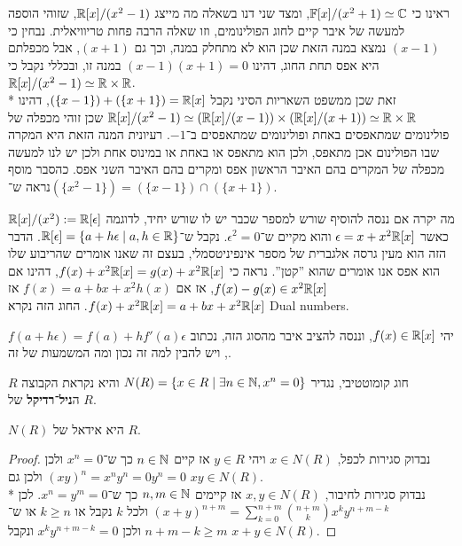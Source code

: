 \begin{example}
	ראינו כי $\mathbb{F}[x] / (x^2 + 1) \simeq \mathbb{C}$, ומצד שני דנו בשאלה מה מייצג $\mathbb{R}[x] / (x^2 - 1)$, שזוהי הוספה למעשה של איבר קיים לחוג הפולינומים, וזו שאלה הרבה פחות טריוויאלית.
	נבחין כי $(x - 1)$ נמצא במנה הזאת שכן הוא לא מתחלק במנה, וכך גם $(x + 1)$, אבל מכפלתם היא אפס תחת החוג, דהינו $(x - 1)(x + 1) = 0$ במנה זו, ובכללי נקבל כי $\mathbb{R}[x] / (x^2 - 1) \simeq \mathbb{R} \times \mathbb{R}$. \\*
	זאת שכן ממשפט השאריות הסיני נקבל $(\{x - 1\}) + (\{x + 1\}) = \mathbb{R}[x]$,
	דהינו $\mathbb{R}[x] / (x^2 - 1) \simeq (\mathbb{R}[x]/(x - 1)) \times (\mathbb{R}[x]/(x + 1)) \simeq \mathbb{R} \times \mathbb{R}$ שכן זוהי מכפלה של פולינומים שמתאפסים באחת ופולינומים שמתאפסים ב־$-1$.
	רעיונית המנה הזאת היא המקרה שבו הפולינום אכן מתאפס, ולכן הוא מתאפס או באחת או במינוס אחת ולכן יש לנו למעשה מכפלה של המקרים בהם האיבר הראשון אפס ומקרים בהם האיבר השני אפס.
	כהסבר מוסף נראה ש־$(\{x^2 - 1\}) = (\{x - 1\}) \cap (\{x + 1\})$.
\end{example}
מה יקרה אם ננסה להוסיף שורש למספר שכבר יש לו שורש יחיד, לדוגמה $\mathbb{R}[x] / (x^2) := \mathbb{R}[\epsilon]$ כאשר $\epsilon = x + x^2 \mathbb{R}[x]$ והוא מקיים ש־$\epsilon^2 = 0$.
נקבל ש־$\mathbb{R}[\epsilon] = \{ a + h\epsilon \mid a, h \in \mathbb{R} \}$. הדבר הזה הוא מעין גרסה אלגברית של מספר אינפיניטסמלי, בעצם זה שאנו אומרים שהריבוע שלו הוא אפס אנו אומרים שהוא ''קטן''.
נראה כי $f(x) + x^2 \mathbb{R}[x] = g(x) + x^2 \mathbb{R}[x]$, דהינו אם $f(x) - g(x) \in x^2 \mathbb{R}[x]$, אז אם $f(x) = a + bx + x^2 h(x)$ אז $f(x) + x^2 \mathbb{R}[x] = a + bx + x^2 \mathbb{R}[x]$.
החוג הזה נקרא Dual numbers.
\begin{exercise}
	יהי $f(x) \in \mathbb{R}[x]$, וננסה להציב איבר מהסוג הזה, נכתוב $f(a + h\epsilon) = f(a) + h f'(a) \epsilon$, ויש להבין למה זה נכון ומה המשמעות של זה.
\end{exercise}
\begin{definition}
	$R$ חוג קומוטטיבי, נגדיר $N(R) = \{ x \in R \mid \exists n \in \mathbb{N}, x^n = 0 \}$ והיא נקראת הקבוצה ה\textbf{ניל־רדיקל} של $R$.
\end{definition}
\begin{proposition}
	$N(R)$ היא אידאל של $R$.
\end{proposition}
\begin{proof}
	נבדוק סגירות לכפל, $x \in N(R)$ ויהי $y \in R$ אז קיים $n \in \mathbb{N}$ כך ש־$x^n = 0$ ולכן ${(xy)}^n = x^n y^n = 0 y^n = 0$ ולכן גם $xy \in N(R)$. \\*
	נבדוק סגירות לחיבור, $x, y \in N(R)$ אז קיימים $n, m \in \mathbb{N}$ כך ש־$x^n = y^m = 0$.
	לכן ${(x + y)}^{n + m} = \sum_{k = 0}^{n + m} \binom{n + m}{k} x^k y^{n + m - k}$ ולכל $k$ נקבל או $k \ge n$ או ש־$n + m - k \ge m$ ולכן $x^k y^{n + m - k} = 0$ ונקבל $x + y \in N(R)$.
\end{proof}
